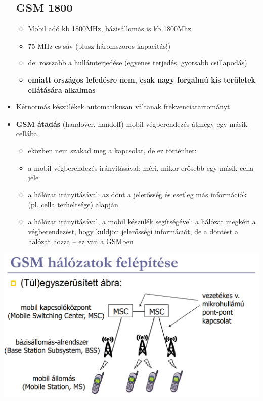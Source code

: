\documentclass[10pt,a4paper]{article}
\begin{document}
\begin{itemize}
\subsection{GSM 1800}
\begin{itemize}
	\item Mobil adó kb 1800MHz, bázisállomás is kb 1800Mhz
	\item 75 MHz-es sáv (plusz háromszoros kapacitás!)
	\item de: rosszabb a hullámterjedése (egyenes terjedés, gyorsabb csillapodás)
	\item \textbf{emiatt országos lefedésre nem, csak nagy forgalmú kis területek
	ellátására alkalmas}
\end{itemize}
\item Kétnormás készülékek automatikusan váltanak frekvenciatartományt
\item \textbf{GSM átadás} (handover, handoff) mobil végberendezés átmegy egy másik cellába
\begin{itemize}
	\item eközben nem szakad meg a kapcsolat, de ez történhet:
	\item a mobil végberendezés irányításával: méri, mikor erősebb
	egy másik cella jele
	\item a hálózat irányításával: az dönt a jelerősség és esetleg más
	információk (pl. cella terheltsége) alapján
	\item a hálózat irányításával, a mobil készülék segítségével: a
	hálózat megkéri a végberendezést, hogy küldjön jelerősségi
	információt, de a döntést a hálózat hozza – ez van a GSMben
\end{itemize}
\end{itemize}
\begin{center}
	\includegraphics[width=0.9\linewidth]{src/GSMhalozat}
\end{center}
\end{document}
